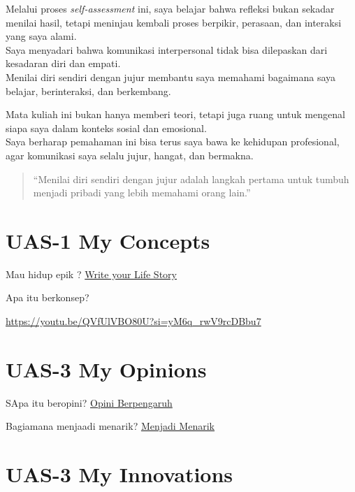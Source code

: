 \documentclass[
  letterpaper,
  DIV=11,
  numbers=noendperiod]{scrreprt}
\begin{document}
Melalui proses \emph{self-assessment} ini, saya belajar bahwa refleksi
bukan sekadar menilai hasil, tetapi meninjau kembali proses berpikir,
perasaan, dan interaksi yang saya alami.\\
Saya menyadari bahwa komunikasi interpersonal tidak bisa dilepaskan dari
kesadaran diri dan empati.\\
Menilai diri sendiri dengan jujur membantu saya memahami bagaimana saya
belajar, berinteraksi, dan berkembang.

Mata kuliah ini bukan hanya memberi teori, tetapi juga ruang untuk
mengenal siapa saya dalam konteks sosial dan emosional.\\
Saya berharap pemahaman ini bisa terus saya bawa ke kehidupan
profesional, agar komunikasi saya selalu jujur, hangat, dan bermakna.

\begin{quote}
``Menilai diri sendiri dengan jujur adalah langkah pertama untuk tumbuh
menjadi pribadi yang lebih memahami orang lain.''
\end{quote}


\chapter{UAS-1 My Concepts}\label{uas-1-my-concepts}

Mau hidup epik ? \href{lifestory.pdf}{Write your Life Story}

Apa itu berkonsep?

\url{https://youtu.be/QVfUlVBO80U?si=yM6q_rwV9rcDBbu7}


\chapter{UAS-3 My Opinions}\label{uas-3-my-opinions}

SApa itu beropini? \href{BM\%20Opini.mp4}{Opini Berpengaruh}

Bagiamana menjaadi menarik? \href{./Interesting.mp4}{Menjadi Menarik}


\chapter{UAS-3 My Innovations}\label{uas-3-my-innovations}

\end{document}
